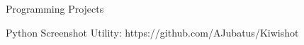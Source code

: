 

\begin{cventries}

%
	\cventry
	{}
	{Programming Projects}
	{}
	{}
	{
		\begin{cvitems}
		\item {Python Screenshot Utility: https://github.com/AJubatus/Kiwishot}
		\end{cvitems}
		}


\end{cventries}
